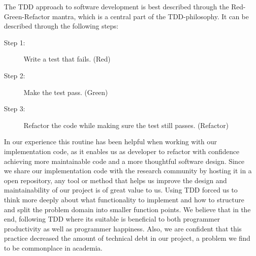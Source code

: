 The TDD approach to software development is best described through the
Red-Green-Refactor mantra, which is a central part of the
TDD-philosophy. It can be described through the following steps:

\begin{description}
    \item[Step 1:] Write a test that fails. (Red)
    \item[Step 2:] Make the test pass. (Green)
    \item[Step 3:] Refactor the code while making sure the test
        still passes. (Refactor)
\end{description}

In our experience this routine has been helpful when working
with our implementation code, as it enables us as developer to
refactor with confidence achieving more maintainable code and a
more thoughtful software design. Since we share our
implementation code with the research community by hosting it in
a open repository, any tool or method that helps us improve the
design and maintainability of our project is of great value to
us. Using TDD forced us to think more deeply about what
functionality to implement and how to structure and split the
problem domain into smaller function points. We believe that in
the end, following TDD where its suitable is beneficial to both
programmer productivity as well as programmer happiness. Also,
we are confident that this practice decreased the amount of
technical debt in our project, a problem we find to be commonplace in academia.
